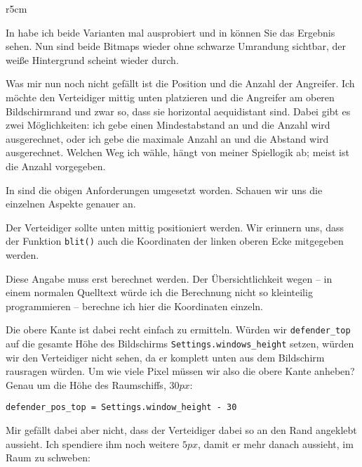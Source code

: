 \begin{wrapfigure}[10]{r}{5cm}
\end{wrapfigure}
In  habe ich beide Varianten mal ausprobiert und in  können Sie das Ergebnis sehen. Nun sind beide Bitmaps wieder ohne schwarze Umrandung sichtbar, der weiße Hintergrund scheint wieder durch.

Was mir nun noch nicht gefällt ist die Position und die Anzahl der Angreifer. Ich möchte den Verteidiger mittig unten platzieren und die Angreifer am oberen Bildschirmrand und zwar so, dass sie horizontal  \gls{aequidistant} sind. Dabei gibt es zwei Möglichkeiten: ich gebe einen Mindestabstand an und die Anzahl wird ausgerechnet, oder ich gebe die maximale Anzahl an und die Abstand wird ausgerechnet. Welchen Weg ich wähle, hängt von meiner Spiellogik ab; meist ist die Anzahl vorgegeben.


In  sind die obigen Anforderungen umgesetzt worden. Schauen wir uns die einzelnen Aspekte genauer an.

Der Verteidiger sollte unten mittig positioniert werden. Wir erinnern uns, dass der Funktion \texttt{blit()} auch die Koordinaten der linken oberen Ecke mitgegeben werden. 

Diese Angabe muss erst berechnet werden. Der Übersichtlichkeit wegen -- in einem normalen Quelltext würde ich die Berechnung nicht so kleinteilig programmieren -- berechne ich hier die Koordinaten einzeln.

Die obere Kante ist dabei recht einfach zu ermitteln. Würden wir \texttt{defender\_top} auf die gesamte Höhe des Bildschirms \texttt{Settings.windows\_height} setzen, würden wir den Verteidiger nicht sehen, da er komplett unten aus dem Bildschirm rausragen würden. Um wie viele Pixel müssen wir also die obere Kante anheben? Genau um die Höhe des Raumschiffs, $30px$:

\lstset{firstnumber=24}
\begin{lstlisting}
defender_pos_top = Settings.window_height - 30
\end{lstlisting}

Mir gefällt dabei aber nicht, dass der Verteidiger dabei so an den Rand angeklebt aussieht. Ich spendiere ihm noch weitere $5px$, damit er mehr danach aussieht, im Raum zu schweben:

